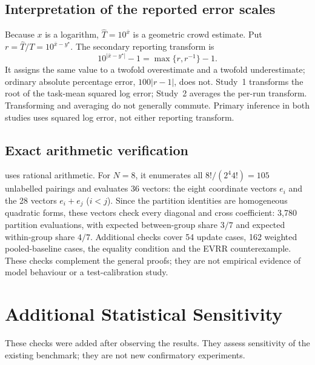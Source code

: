 \documentclass[10pt]{article}
\newenvironment{fittable}{\begin{lrbox}{\manuscripttable}}{%
\end{lrbox}\ifdim\wd\manuscripttable>\linewidth
\resizebox{\linewidth}{!}{\usebox{\manuscripttable}}%
\else\usebox{\manuscripttable}\fi}
\theoremstyle{manuscript}\newtheorem{proposition}{Proposition}
\begin{document}
\subsection{Interpretation of the reported error scales}
Because $x$ is a logarithm, $\widehat T=10^{\bar x}$ is a geometric crowd estimate. Put $r=\widehat T/T=10^{\bar x-y^\star}$. The secondary reporting transform is
\begin{equation}\label{eq:miss-transform}
10^{|\bar x-y^\star|}-1=\max\{r,r^{-1}\}-1.
\end{equation}
It assigns the same value to a twofold overestimate and a twofold underestimate; ordinary absolute percentage error, $100|r-1|$, does not. Study~1 transforms the root of the task-mean squared log error; Study~2 averages the per-run transform. Transforming and averaging do not generally commute. Primary inference in both studies uses squared log error, not either reporting transform.

\subsection{Exact arithmetic verification}
 uses rational arithmetic. For $N=8$, it enumerates all $8!/(2^4 4!)=105$ unlabelled pairings and evaluates 36 vectors: the eight coordinate vectors $e_i$ and the 28 vectors $e_i+e_j$ ($i<j$). Since the partition identities are homogeneous quadratic forms, these vectors check every diagonal and cross coefficient: 3,780 partition evaluations, with expected between-group share $3/7$ and expected within-group share $4/7$. Additional checks cover 54 update cases, 162 weighted pooled-baseline cases, the equality condition and the EVRR counterexample. These checks complement the general proofs; they are not empirical evidence of model behaviour or a test-calibration study.

\section{Additional Statistical Sensitivity}\label{app:sensitivity}
These checks were added after observing the results. They assess sensitivity of the existing benchmark; they are not new confirmatory experiments.
\begin{table}[ht]\centering\small
\caption{Study~2 sensitivity across all 14 planned contrasts. Global Holm adjusts all 14 raw exact Wilcoxon $p$-values together. LOTO / LODO omit one task / one topic domain, then recompute Holm within the original families ($m=4,8,2$); columns report the \emph{largest} adjusted $p$ over 40 / 15 subsets. These are sensitivity summaries, not additional hypothesis families.}\label{tab:sensitivity}
\begin{fittable}

\end{fittable}
\end{table}

\end{document}
